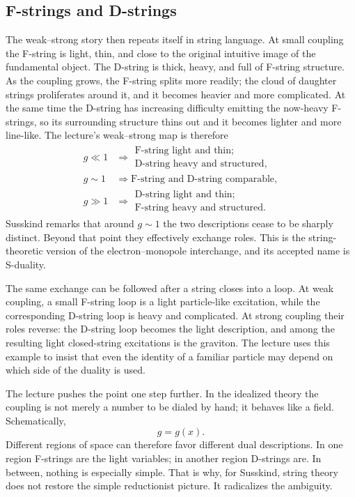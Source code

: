 \subsection{F-strings and D-strings}

The weak--strong story then repeats itself in string language. At small coupling the F-string is light, thin, and close to the original intuitive image of the fundamental object. The D-string is thick, heavy, and full of F-string structure. As the coupling grows, the F-string splits more readily; the cloud of daughter strings proliferates around it, and it becomes heavier and more complicated. At the same time the D-string has increasing difficulty emitting the now-heavy F-strings, so its surrounding structure thins out and it becomes lighter and more line-like. The lecture's weak--strong map is therefore
\begin{align}
g \ll 1
&\Rightarrow
\begin{gathered}
\text{F-string light and thin;}\\
\text{D-string heavy and structured},
\end{gathered}\\
g \sim 1
&\Rightarrow
\text{F-string and D-string comparable},\\
g \gg 1
&\Rightarrow
\begin{gathered}
\text{D-string light and thin;}\\
\text{F-string heavy and structured}.
\end{gathered}
\end{align}
Susskind remarks that around \(g\sim 1\) the two descriptions cease to be sharply distinct. Beyond that point they effectively exchange roles. This is the string-theoretic version of the electron--monopole interchange, and its accepted name is S-duality.

The same exchange can be followed after a string closes into a loop. At weak coupling, a small F-string loop is a light particle-like excitation, while the corresponding D-string loop is heavy and complicated. At strong coupling their roles reverse: the D-string loop becomes the light description, and among the resulting light closed-string excitations is the graviton. The lecture uses this example to insist that even the identity of a familiar particle may depend on which side of the duality is used.

The lecture pushes the point one step further. In the idealized theory the coupling is not merely a number to be dialed by hand; it behaves like a field. Schematically,
\begin{equation}
g = g(x).
\end{equation}
Different regions of space can therefore favor different dual descriptions. In one region F-strings are the light variables; in another region D-strings are. In between, nothing is especially simple. That is why, for Susskind, string theory does not restore the simple reductionist picture. It radicalizes the ambiguity.


